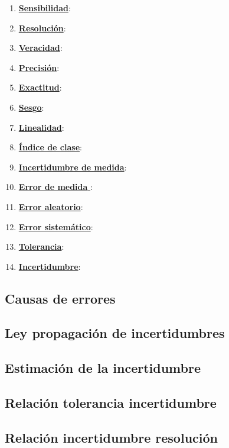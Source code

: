 \begin{enumerate}
	\item \underline{\textbf{Sensibilidad}}:
	\item \underline{\textbf{Resolución}}:
	\item \underline{\textbf{Veracidad}}:
	\item \underline{\textbf{Precisión}}:
	\item \underline{\textbf{Exactitud}}:
	\item \underline{\textbf{Sesgo}}:
	\item \underline{\textbf{Linealidad}}:
	\item \underline{\textbf{Índice de clase}}:
	\item \underline{\textbf{Incertidumbre de medida}}:
	\item \underline{\textbf{Error de medida }}:
	\item \underline{\textbf{Error aleatorio}}:
	\item \underline{\textbf{Error sistemático}}:
	\item \underline{\textbf{Tolerancia}}:
	\item \underline{\textbf{Incertidumbre}}:
\end{enumerate}
\subsection{Causas de errores}
\subsection{Ley propagación de incertidumbres}
\subsection{Estimación de la incertidumbre}
\subsection{Relación tolerancia incertidumbre}
\subsection{Relación incertidumbre resolución}